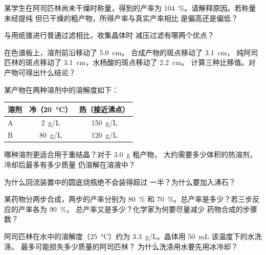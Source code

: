\begin{exercise}[$\star\star$]\label{exo:g10:synthesis-yield:7}
某学生在阿司匹林尚未干燥时称量，得到的产率为
\qty{104}{\percent}。请解释原因。若称量未经提纯
但已干燥的粗产物，所得产率与真实产率相比
是偏高还是偏低？
\end{exercise}

\begin{exercise}[$\star\star$]\label{exo:g10:synthesis-yield:8}
与用纸锥进行普通过滤相比，收集晶体时
减压过滤有哪两个优点？
\end{exercise}

\begin{exercise}[$\star\star$]\label{exo:g10:synthesis-yield:9}
在色谱板上，溶剂前沿移动了 \qty{5.0}{cm}。
合成产物的斑点移动了 \qty{3.1}{cm}，
纯阿司匹林的斑点移动了 \qty{3.1}{cm}，水杨酸的斑点移动了 \qty{2.2}{cm}。
计算三种比移值。对产物可得出什么结论？
\end{exercise}

\begin{exercise}[$\star\star$]\label{exo:g10:synthesis-yield:10}
某产物在两种溶剂中的溶解度如下：
\begin{center}
\begin{tabular}{lcc}
\hline
溶剂 & 冷（\qty{20}{\celsius}） & 热（接近沸点） \\
\hline
A & \qty{2}{g/L} & \qty{150}{g/L} \\
B & \qty{80}{g/L} & \qty{120}{g/L} \\
\hline
\end{tabular}
\end{center}
哪种溶剂更适合用于重结晶？对于 \qty{3.0}{g} 粗产物，
大约需要多少体积的热溶剂，冷却后最多有多少质量
仍溶解在溶液中？
\end{exercise}

\begin{exercise}[$\star\star$]\label{exo:g10:synthesis-yield:11}
为什么回流装置中的圆底烧瓶绝不会装得超过
一半？为什么要加入沸石？
\end{exercise}

\begin{exercise}[$\star\star\star$]\label{exo:g10:synthesis-yield:12}
某药物分两步合成，两步的产率分别为 \qty{80}{\percent} 和
\qty{70}{\percent}。总产率是多少？若三步反应的产率各为 \qty{90}{\percent}，
总产率又是多少？化学家为何要尽量减少
药物合成的步骤数？
\end{exercise}

\begin{exercise}[$\star\star\star$]\label{exo:g10:synthesis-yield:13}
阿司匹林在水中的溶解度（\qty{25}{\celsius}）约为
\qty{3.3}{g/L}。晶体用 \qty{50}{mL} 该温度下的水洗涤。
最多可能损失多少质量的阿司匹林？
为什么洗涤用水要先用冰冷却？
\end{exercise}

